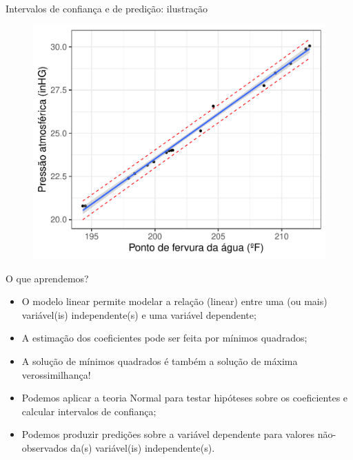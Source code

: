 \begin{frame}{Intervalos de confiança e de predição: ilustração}
 \begin{figure}
  \begin{center}
   \includegraphics[scale=.6]{figures/pressure_model.pdf}
  \end{center}
 \end{figure}
\end{frame}

\begin{frame}{O que aprendemos?}
\begin{itemize}
  \item[\faLightbulbO] O modelo linear permite modelar a relação (linear) entre uma (ou mais) variável(is) independente(s) e uma variável dependente;    
  \item[\faLightbulbO] A estimação dos coeficientes pode ser feita por mínimos quadrados; 
  \item[\faLightbulbO] A solução de mínimos quadrados é também a solução de máxima verossimilhança!
  \item[\faLightbulbO] Podemos aplicar a teoria Normal para testar hipóteses sobre os coeficientes e calcular intervalos de confiança;
  \item[\faLightbulbO] Podemos produzir predições sobre a variável dependente para valores não-observados da(s) variável(is) independente(s).
   \end{itemize}
 \end{frame} 
 
